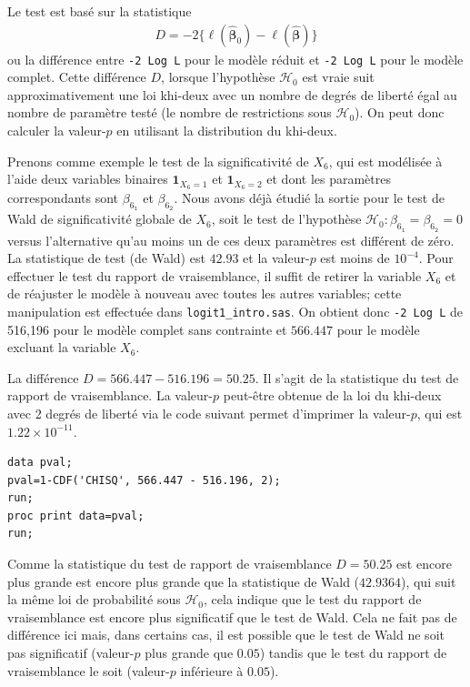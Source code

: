 \documentclass[
  11pt,
  letterpaper,
]{book}
\theoremstyle{definition}
\theoremstyle{definition}
\theoremstyle{definition}
\theoremstyle{remark}
\begin{document}
Le test est basé sur la statistique
\begin{align*}
 D = -2\{\ell(\widehat{\boldsymbol{\beta}}_0)-\ell(\widehat{\boldsymbol{\beta}})\}
\end{align*}
ou la différence entre \texttt{-2\ Log\ L} pour le modèle réduit et \texttt{-2\ Log\ L} pour le modèle complet. Cette différence \(D\), lorsque l'hypothèse \(\mathcal{H}_0\) est vraie suit approximativement une loi khi-deux avec un nombre de degrés de liberté égal au nombre de paramètre testé (le nombre de restrictions sous \(\mathcal{H}_0\)). On peut donc calculer la valeur-\(p\) en utilisant la distribution du khi-deux.

Prenons comme exemple le test de la significativité de \(X_6\), qui est modélisée à l'aide deux variables binaires \({\mathbf 1}_{X_6=1}\) et \({\mathbf 1}_{X_6=2}\) et dont les paramètres correspondants sont \(\beta_{6_{\texttt{1}}}\) et \(\beta_{6_{\texttt{2}}}\). Nous avons déjà étudié la sortie pour le test de Wald de significativité globale de \(X_6\), soit le test de l'hypothèse \(\mathcal{H}_0: \beta_{6_{\texttt{1}}}=\beta_{6_{\texttt{2}}}=0\) versus l'alternative qu'au moins un de ces deux paramètres est différent de zéro. La statistique de test (de Wald) est \(42.93\) et la valeur-\(p\) est moins de \(10^{-4}\). Pour effectuer le test du rapport de vraisemblance, il suffit de retirer la variable \(X_6\) et de réajuster le modèle à nouveau avec toutes les autres variables; cette manipulation est effectuée dans \texttt{logit1\_intro.sas}. On obtient donc
\texttt{-2\ Log\ L} de 516,196 pour le modèle complet sans contrainte et \(566.447\) pour le modèle excluant la variable \(X_6\).

La différence \(D = 566.447 - 516.196 = 50.25\). Il s'agit de la statistique du test de rapport de vraisemblance. La valeur-\(p\) peut-être obtenue de la loi du khi-deux avec 2 degrés de liberté via le code suivant permet d'imprimer la valeur-\(p\), qui est \(1.22 \times 10^{-11}\).

\begin{verbatim}
data pval;
pval=1-CDF('CHISQ', 566.447 - 516.196, 2);
run;
proc print data=pval;
run;
\end{verbatim}

Comme la statistique du test de rapport de vraisemblance \(D=50.25\) est encore plus grande est encore plus grande que la statistique de Wald (\(42.9364\)), qui suit la même loi de probabilité sous \(\mathcal{H}_0\), cela indique que le test du rapport de vraisemblance est encore plus significatif que le test de Wald. Cela ne fait pas de différence ici mais, dans certains cas, il est possible que le test de Wald ne soit pas significatif (valeur-\(p\) plus grande que \(0.05\)) tandis que le test du rapport de vraisemblance le soit (valeur-\(p\) inférieure à \(0.05\)).
\end{document}
